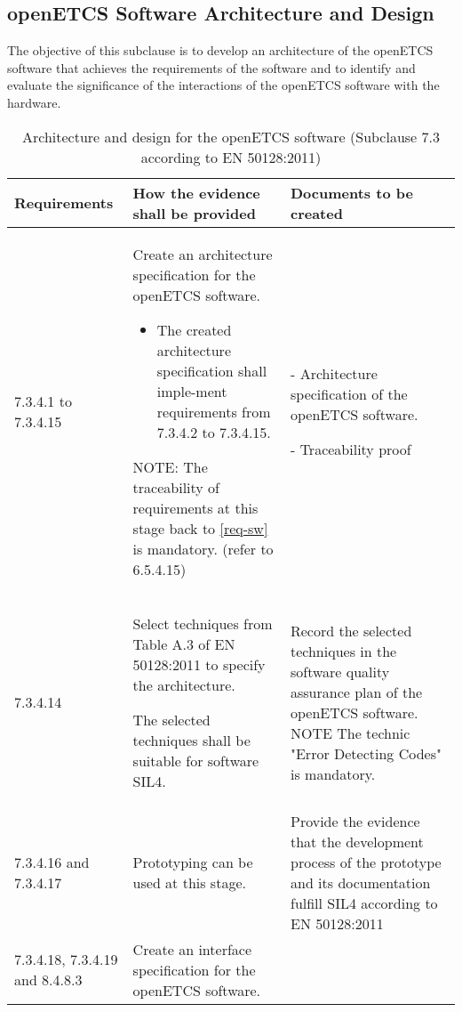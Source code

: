 \documentclass{template/openetcs_report}
\begin{document}
\subsection{openETCS Software Architecture and Design}
\label{arc-sw}
\begin{flushleft}
The objective of this subclause is to develop an architecture of the openETCS software that achieves the requirements of the software and to identify and evaluate the significance of the interactions of the openETCS software with the hardware.
\end{flushleft}
{\footnotesize\sffamily\centering
\begin{longtable}{|p{2cm}|p{9cm}|p{3cm}|}
\caption{Architecture and design for the openETCS software (Subclause 7.3 according to EN 50128:2011)}\\
\hline
\bfseries Requirements & \bfseries How the evidence shall be provided & \bfseries Documents to be created\\
\hline
\hline
\endhead
\hline
\endfoot

7.3.4.1 to 7.3.4.15 & Create an architecture specification for the openETCS software.
\begin{itemize}\itemsep=0pt
  \item The created architecture specification shall imple-ment requirements from 7.3.4.2 to 7.3.4.15.
\end{itemize}
NOTE: \linebreak
The traceability of requirements at this stage back to \ref{req-sw} is mandatory. (refer to 6.5.4.15)
& - Architecture specification of the openETCS software.

- Traceability proof\\ 
\hline
7.3.4.14 & Select techniques from Table A.3 of EN 50128:2011 to specify the architecture.

The selected techniques shall be suitable for software SIL4.
& Record the selected techniques in the software quality assurance plan of the openETCS software.
\linebreak
\linebreak
NOTE\linebreak
The technic "Error Detecting Codes" is mandatory.\\ 
\hline
7.3.4.16 and 7.3.4.17 & Prototyping can be used at this stage.
& Provide the evidence that the development process of the prototype and its documentation fulfill SIL4 according to EN 50128:2011\\ 
\hline
7.3.4.18, 7.3.4.19 and 8.4.8.3 & Create an interface specification for the openETCS software.
 

\end{longtable}}
\end{document}
